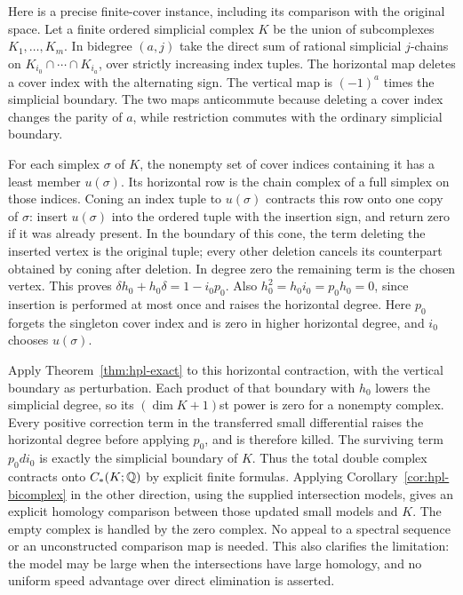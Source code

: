 Here is a precise finite-cover instance, including its comparison with the
original space.  Let a finite ordered simplicial complex $K$ be the union
of subcomplexes $K_1,\ldots,K_m$.  In bidegree $(a,j)$ take the direct sum
of rational simplicial $j$-chains on $K_{i_0}\cap\cdots\cap K_{i_a}$,
over strictly increasing index tuples.  The horizontal map deletes a cover
index with the alternating sign.  The vertical map is $(-1)^a$ times the
simplicial boundary.  The two maps anticommute because deleting a cover
index changes the parity of $a$, while restriction commutes with the
ordinary simplicial boundary.

For each simplex $\sigma$ of $K$, the nonempty set of cover indices
containing it has a least member $u(\sigma)$.  Its horizontal row is the
chain complex of a full simplex on those indices.  Coning an index tuple
to $u(\sigma)$ contracts this row onto one copy of $\sigma$: insert
$u(\sigma)$ into the ordered tuple with the insertion sign, and return
zero if it was already present.  In the boundary of this cone, the term
deleting the inserted vertex is the original tuple; every other deletion
cancels its counterpart obtained by coning after deletion.  In degree zero
the remaining term is the chosen vertex.  This proves
$\delta h_0+h_0\delta=1-i_0p_0$.  Also $h_0^2=h_0i_0=p_0h_0=0$,
since insertion is performed at most once and raises the horizontal degree.
Here $p_0$ forgets the singleton cover index and is zero in higher
horizontal degree, and $i_0$ chooses $u(\sigma)$.

Apply Theorem~\ref{thm:hpl-exact} to this horizontal contraction, with the
vertical boundary as perturbation.  Each product of that boundary with
$h_0$ lowers the simplicial degree, so its $(\dim K+1)$st power is zero
for a nonempty complex.  Every positive correction term in the transferred
small differential raises the horizontal degree before applying $p_0$,
and is therefore killed.  The surviving term $p_0di_0$ is exactly the
simplicial boundary of $K$.  Thus the total double complex contracts onto
$C_*(K;\mathbb Q)$ by explicit finite formulas.  Applying
Corollary~\ref{cor:hpl-bicomplex} in the other direction, using the supplied
intersection models, gives an explicit homology comparison between those
updated small models and $K$.  The empty complex is handled by the zero
complex.  No appeal to a spectral sequence or an unconstructed comparison
map is needed.  This also clarifies the limitation: the model may be large
when the intersections have large homology, and no uniform speed advantage
over direct elimination is asserted.

